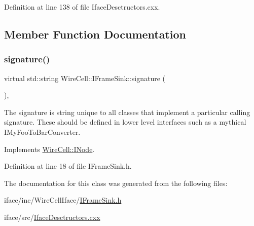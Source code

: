 Definition at line 138 of file Iface\+Desctructors.\+cxx.



\subsection{Member Function Documentation}
\mbox{\label{class_wire_cell_1_1_i_frame_sink_af86ff5ba30366290d7ac9155c805e59b}} 
\subsubsection{\texorpdfstring{signature()}{signature()}}
{\footnotesize\ttfamily virtual std\+::string Wire\+Cell\+::\+I\+Frame\+Sink\+::signature (\begin{DoxyParamCaption}{ }\end{DoxyParamCaption})\hspace{0.3cm}{\ttfamily [inline]}, {\ttfamily [virtual]}}

The signature is string unique to all classes that implement a particular calling signature. These should be defined in lower level interfaces such as a mythical I\+My\+Foo\+To\+Bar\+Converter. 

Implements \hyperlink{class_wire_cell_1_1_i_node_a0b0763465adf5ba7febe8e378162b584}{Wire\+Cell\+::\+I\+Node}.



Definition at line 18 of file I\+Frame\+Sink.\+h.



The documentation for this class was generated from the following files\+:\begin{DoxyCompactItemize}
\item 
iface/inc/\+Wire\+Cell\+Iface/\hyperlink{_i_frame_sink_8h}{I\+Frame\+Sink.\+h}\item 
iface/src/\hyperlink{_iface_desctructors_8cxx}{Iface\+Desctructors.\+cxx}\end{DoxyCompactItemize}
